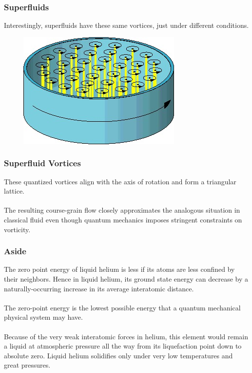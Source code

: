 \documentclass[10pt]{beamer}
\theoremstyle{definition}
\begin{document}
\begin{frame}
    \frametitle{Superfluids}

    Interestingly, superfluids have these same vortices, just under different
    conditions.

    \begin{figure}
    \begin{center}
        \includegraphics[scale=0.006]{superfluidvort}
    \end{center}
    \end{figure}

\end{frame}


\begin{frame}
    \frametitle{Superfluid Vortices}

    These quantized vortices align with the axis of rotation and form a
    triangular lattice.
    \\~\\

    The resulting course-grain flow closely approximates the analogous
    situation in classical fluid even though quantum mechanics imposes
    stringent constraints on vorticity.

\end{frame}


\begin{frame}
    \frametitle{Aside}

    The zero point energy of liquid helium is less if its atoms are less 
    confined by their neighbors. Hence in liquid helium, its ground 
    state energy can decrease by a naturally-occurring increase in 
    its average interatomic distance.
    \\~\\
    The zero-point energy is the lowest possible energy that a 
    quantum mechanical physical system may have.
    \\~\\
    Because of the very weak interatomic forces in helium, this element 
    would remain a liquid at atmospheric pressure all the way from its 
    liquefaction point down to absolute zero. Liquid helium solidifies 
    only under very low temperatures and great pressures.
\end{frame}
\end{document}
